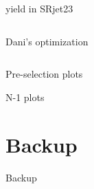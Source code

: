 \documentclass[mathserif,serif]{beamer}
\begin{document}
\begin{frame}{yield in SRjet23}
\begin{table}[htbp]
\centering
\tiny

\begin{columns}

\begin{column}{0.5\textwidth}

\caption{\tiny Dani's optimization}
\end{column}

\begin{column}{0.5\textwidth}

\caption{\tiny My optimization}
\end{column}

\end{columns}
\end{table}
\end{frame}

\begin{frame}
\begin{center}
\huge
Pre-selection plots
\end{center}
\end{frame}



\begin{frame}
\begin{center}
\huge
N-1 plots
\end{center}
\end{frame}



\section{Backup}

\begin{frame}
\begin{center}
\huge
Backup
\end{center}
\end{frame}
\end{document}
